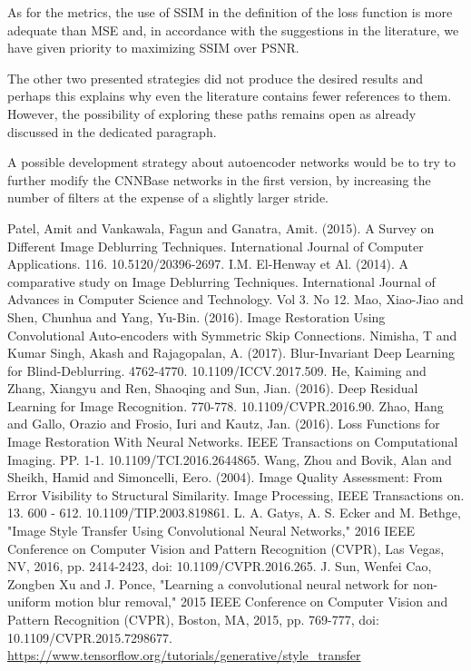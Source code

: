 \documentclass[12pt,a4paper]{article}
\begin{document}
As for the metrics, the use of SSIM in the definition of the loss function is more adequate than MSE and, in accordance with the suggestions in the literature, we have given priority to maximizing SSIM over PSNR.

The other two presented strategies did not produce the desired results and perhaps this explains why even the literature contains fewer references to them. However, the possibility of exploring these paths remains open as already discussed in the dedicated paragraph.


A possible development strategy about autoencoder networks would be to try to further modify the CNNBase networks in the first version, by increasing the number of filters at the expense of a slightly larger stride.

\newpage

\newpage
\begin{thebibliography}{99}
  Patel, Amit and Vankawala, Fagun and Ganatra, Amit. (2015). A Survey on Different Image Deblurring Techniques. International Journal of Computer Applications. 116. 10.5120/20396-2697. 
 I.M. El-Henway et Al. (2014). A comparative study on Image Deblurring Techniques. International Journal of Advances in Computer Science and Technology. Vol 3. No 12.
 Mao, Xiao-Jiao and Shen, Chunhua and Yang, Yu-Bin. (2016). Image Restoration Using Convolutional Auto-encoders with Symmetric Skip Connections. 
 Nimisha, T and Kumar Singh, Akash and Rajagopalan, A. (2017). Blur-Invariant Deep Learning for Blind-Deblurring. 4762-4770. 10.1109/ICCV.2017.509. 
 He, Kaiming and Zhang, Xiangyu and Ren, Shaoqing and Sun, Jian. (2016). Deep Residual Learning for Image Recognition. 770-778. 10.1109/CVPR.2016.90. 
 Zhao, Hang and Gallo, Orazio and Frosio, Iuri and Kautz, Jan. (2016). Loss Functions for Image Restoration With Neural Networks. IEEE Transactions on Computational Imaging. PP. 1-1. 10.1109/TCI.2016.2644865.
 Wang, Zhou and Bovik, Alan and Sheikh, Hamid and Simoncelli, Eero. (2004). Image Quality Assessment: From Error Visibility to Structural Similarity. Image Processing, IEEE Transactions on. 13. 600 - 612. 10.1109/TIP.2003.819861. 
 L. A. Gatys, A. S. Ecker and M. Bethge, "Image Style Transfer Using Convolutional Neural Networks," 2016 IEEE Conference on Computer Vision and Pattern Recognition (CVPR), Las Vegas, NV, 2016, pp. 2414-2423, doi: 10.1109/CVPR.2016.265.
 J. Sun, Wenfei Cao, Zongben Xu and J. Ponce, "Learning a convolutional neural network for non-uniform motion blur removal," 2015 IEEE Conference on Computer Vision and Pattern Recognition (CVPR), Boston, MA, 2015, pp. 769-777, doi: 10.1109/CVPR.2015.7298677.
 \url{https://www.tensorflow.org/tutorials/generative/style_transfer}

\end{thebibliography}
\end{document}
